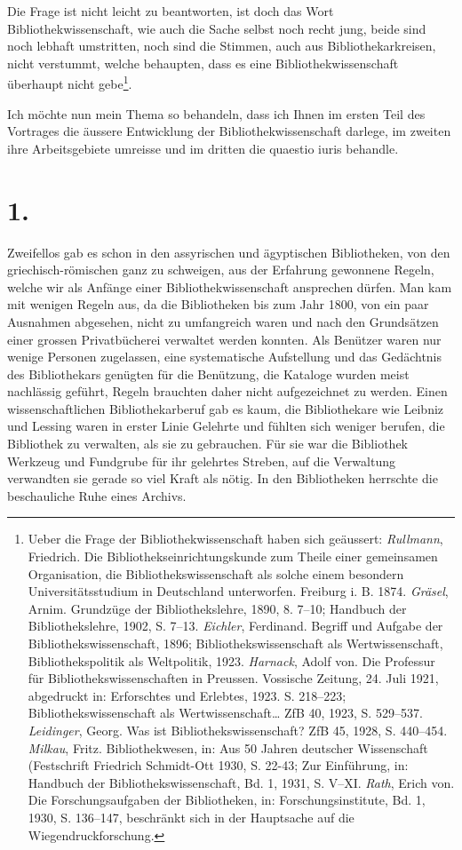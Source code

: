 \documentclass[a4paper,
fontsize=11pt,
oneside,
numbers=noperiodatend,
parskip=half-,
bibliography=totoc,
final
]{scrartcl}
\begin{document}
Die Frage ist nicht leicht zu beantworten, ist doch das Wort
Bibliothekwissenschaft, wie auch die Sache selbst noch recht jung, beide
sind noch lebhaft umstritten, noch sind die Stimmen, auch aus
Bibliothekarkreisen, nicht verstummt, welche behaupten, dass es eine
Bibliothekwissenschaft überhaupt nicht gebe\footnote{Ueber die Frage der
  Bibliothekwissenschaft haben sich geäussert: \emph{Rullmann},
  Friedrich. Die Bibliothekseinrichtungskunde zum Theile einer
  gemeinsamen Organisation, die Bibliothekswissenschaft als solche einem
  besondern Universitätsstudium in Deutschland unterworfen. Freiburg i.
  B. 1874. \emph{Gräsel}, Arnim. Grundzüge der Bibliothekslehre, 1890,
  8. 7--10; Handbuch der Bibliothekslehre, 1902, S. 7--13.
  \emph{Eichler}, Ferdinand. Begriff und Aufgabe der
  Bibliothekswissenschaft, 1896; Bibliothekswissenschaft als
  Wertwissenschaft, Bibliothekspolitik als Weltpolitik, 1923.
  \emph{Harnack}, Adolf von. Die Professur für Bibliothekswissenschaften
  in Preussen. Vossische Zeitung, 24. Juli 1921, abgedruckt in:
  Erforschtes und Erlebtes, 1923. S. 218--223; Bibliothekswissenschaft
  als Wertwissenschaft\ldots{} ZfB 40, 1923, S. 529--537.
  \emph{Leidinger}, Georg. Was ist Bibliothekswissenschaft? ZfB 45,
  1928, S. 440--454. \emph{Milkau}, Fritz. Bibliothekwesen, in: Aus 50
  Jahren deutscher Wissenschaft (Festschrift Friedrich Schmidt-Ott 1930,
  S. 22-43; Zur Einführung, in: Handbuch der Bibliothekswissenschaft,
  Bd. 1, 1931, S. V--XI. \emph{Rath}, Erich von. Die Forschungsaufgaben
  der Bibliotheken, in: Forschungsinstitute, Bd. 1, 1930, S. 136--147,
  beschränkt sich in der Hauptsache auf die Wiegendruckforschung.}.

Ich möchte nun mein Thema so behandeln, dass ich Ihnen im ersten Teil
des Vortrages die äussere Entwicklung der Bibliothekwissenschaft
darlege, im zweiten ihre Arbeitsgebiete umreisse und im dritten die
quaestio iuris behandle.

\hypertarget{section}{%
\section{1.}\label{section}}

Zweifellos gab es schon in den assyrischen und ägyptischen Bibliotheken,
von den griechisch-römischen ganz zu schweigen, aus der Erfahrung
gewonnene Regeln, welche wir als Anfänge einer Bibliothekwissenschaft
ansprechen dürfen. Man kam mit wenigen Regeln aus, da die Bibliotheken
bis zum Jahr 1800, von ein paar Ausnahmen abgesehen, nicht zu
umfangreich waren und nach den Grundsätzen einer grossen Privatbücherei
verwaltet werden konnten. Als Benützer waren nur wenige Personen
zugelassen, eine systematische Aufstellung und das Gedächtnis des
Bibliothekars genügten für die Benützung, die Kataloge wurden meist
nachlässig geführt, Regeln brauchten daher nicht aufgezeichnet zu
werden. Einen wissenschaftlichen Bibliothekarberuf gab es kaum, die
Bibliothekare wie Leibniz und Lessing waren in erster Linie Gelehrte und
fühlten sich weniger berufen, die Bibliothek zu verwalten, als sie zu
gebrauchen. Für sie war die Bibliothek Werkzeug und Fundgrube für ihr
gelehrtes Streben, auf die Verwaltung verwandten sie gerade so viel
Kraft als nötig. In den Bibliotheken herrschte die beschauliche Ruhe
eines Archivs.
\end{document}
